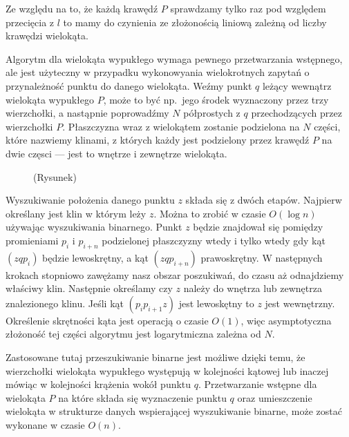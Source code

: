 \documentclass[12pt,oneside,brudnopis]{xelatex-mgr/xmgr}
\begin{document}
Ze względu na to, że każdą krawędź $P$ sprawdzamy tylko raz pod względem
przecięcia z $l$ to mamy do czynienia ze złożonością liniową zależną od
liczby krawędzi wielokąta.

Algorytm dla wielokąta wypukłego wymaga pewnego przetwarzania
wstępnego, ale jest użyteczny w przypadku wykonowyania wielokrotnych
zapytań o przynależność punktu do danego wielokąta. Weźmy punkt $q$
leżący wewnątrz wielokąta wypukłego $P$, może to być np.\ jego środek
wyznaczony przez trzy wierzchołki, a nastąpnie poprowadźmy $N$
półprostych z $q$ przechodzących przez wierzchołki $P$. Płaszczyzna
wraz z wielokątem zostanie podzielona na $N$ części, które nazwiemy
klinami, z których każdy jest podzielony przez krawędź $P$ na dwie
częsci --- jest to wnętrze i zewnętrze wielokąta.

\begin{figure}[htp]
  \centering
  \caption{(Rysunek)}
\end{figure}

Wyszukiwanie położenia danego punktu $z$ składa się z dwóch
etapów. Najpierw określany jest klin w którym leży $z$. Można to
zrobić w czasie $O(\log n)$ używając wyszukiwania binarnego. Punkt $z$
będzie znajdował się pomiędzy promieniami $p_i$ i $p_{i+n}$
podzielonej płaszczyzny wtedy i tylko wtedy gdy kąt $(zqp_i)$ będzie
lewoskrętny, a kąt $(zqp_{i+n})$ prawoskrętny. W następnych krokach
stopniowo zawężamy nasz obszar poszukiwań, do czasu aż odnajdziemy
właściwy klin. Następnie określamy czy $z$ należy do wnętrza lub
zewnętrza znalezionego klinu. Jeśli kąt $(p_{i}p_{i+1}z)$ jest
lewoskętny to $z$ jest wewnętrzny. Określenie skrętności kąta jest
operacją o czasie $O(1)$, więc asymptotyczna złożoność tej części
algorytmu jest logarytmiczna zależna od $N$.

Zastosowane tutaj przeszukiwanie binarne jest możliwe dzięki temu, że
wierzchołki wielokąta wypukłego występują w kolejności kątowej lub
inaczej mówiąc w kolejności krążenia wokół punktu $q$. Przetwarzanie
wstępne dla wielokąta $P$ na które składa się wyznaczenie punktu $q$
oraz umieszczenie wielokąta w strukturze danych wspierającej
wyszukiwanie binarne, może zostać wykonane w czasie $O(n)$.
\end{document}
